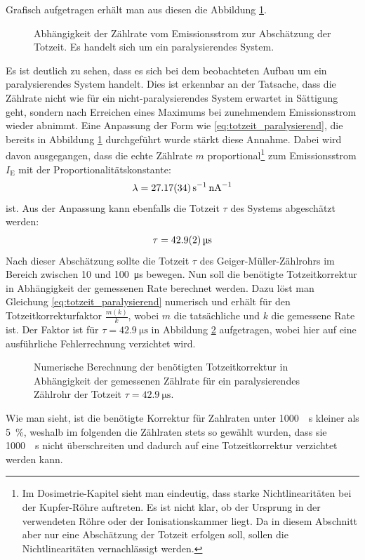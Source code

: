 \documentclass[11pt, a4paper]{article}
\numberwithin{equation}{section}
\begin{document}
Grafisch aufgetragen erhält man aus diesen die Abbildung \ref{fig:totzeit}.
\begin{figure}[ht]
	\centering
	
	\caption{Abhängigkeit der Zählrate vom Emissionsstrom zur Abschätzung der Totzeit. Es handelt sich um ein paralysierendes System.}
	\label{fig:totzeit}
\end{figure}
Es ist deutlich zu sehen, dass es sich bei dem beobachteten Aufbau um ein paralysierendes System handelt.
Dies ist erkennbar an der Tatsache, dass die Zählrate nicht wie für ein nicht-paralysierendes System erwartet in Sättigung geht, sondern nach Erreichen eines Maximums bei zunehmendem Emissionsstrom wieder abnimmt.
Eine Anpassung der Form wie \eqref{eq:totzeit_paralysierend}, die bereits in Abbildung \ref{fig:totzeit} durchgeführt wurde stärkt diese Annahme.
Dabei wird davon ausgegangen, dass die echte Zählrate $m$ proportional\footnote{Im Dosimetrie-Kapitel sieht man eindeutig, dass starke Nichtlinearitäten bei der Kupfer-Röhre auftreten. Es ist nicht klar, ob der Ursprung in der verwendeten Röhre oder der Ionisationskammer liegt. Da in diesem Abschnitt aber nur eine Abschätzung der Totzeit erfolgen soll, sollen die Nichtlinearitäten vernachlässigt werden.} zum Emissionsstrom $I_\mathrm{E}$ mit der Proportionalitätskonstante:
\begin{align}
	\lambda =\SI{27.17 +- 0.34}{\per\second\per\nano\ampere}
\end{align}
ist.
Aus der Anpassung kann ebenfalls die Totzeit $\tau$ des Systems abgeschätzt werden:
\begin{align}
\tau = \SI{42.9 +- 0.2}{\micro\second}
\end{align}
Nach dieser Abschätzung sollte die Totzeit $\tau$ des Geiger-Müller-Zählrohrs im Bereich zwischen \num{10} und \SI{100}{\micro\second} bewegen.
Nun soll die benötigte Totzeitkorrektur in Abhängigkeit der gemessenen Rate berechnet werden.
Dazu löst man Gleichung \eqref{eq:totzeit_paralysierend} numerisch und erhält für den Totzeitkorrekturfaktor $\frac{m(k)}{k}$, wobei $m$ die tatsächliche und $k$ die gemessene Rate ist.
Der Faktor ist für $\tau = \SI{42.9}{\micro\second}$ in Abbildung \ref{fig:totzeitkorrektur_messung} aufgetragen, wobei hier auf eine ausführliche Fehlerrechnung verzichtet wird.
\begin{figure}[ht]
	\centering
	
	\caption{Numerische Berechnung der benötigten Totzeitkorrektur in Abhängigkeit der gemessenen Zählrate für ein paralysierendes Zählrohr der Totzeit $\tau =\SI{42.9}{\micro\second}$.}
	\label{fig:totzeitkorrektur_messung}
\end{figure}
Wie man sieht, ist die benötigte Korrektur für Zahlraten unter \SI{1000}{\per\second} kleiner als \SI{5}{\percent}, weshalb im folgenden die Zählraten stets so gewählt wurden, dass sie \SI{1000}{\per\second} nicht überschreiten und dadurch auf eine Totzeitkorrektur verzichtet werden kann.
\end{document}
